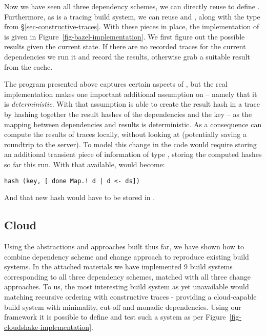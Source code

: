 Now we have seen all three dependency schemes, we can directly reuse  to define \Bazel. Furthermore, as \Bazel is a tracing build system, we can reuse  and , along with the  type from \S\ref{sec-constructive-traces}. With these pieces in place, the implementation of \Bazel is given in Figure~\ref{fig-bazel-implementation}. We first figure out the possible results given the current state. If there are no recorded traces for the current dependencies we run it and record the results, otherwise grab a suitable result from the  cache.

The program presented above captures certain aspects of \Bazel, but the real implementation makes one important additional assumption on  -- namely that it is \textit{deterministic}. With that assumption \Bazel is able to create the result hash in a trace by hashing together the result hashes of the dependencies and the key -- as the mapping between dependencies and results is deterministic. As a consequence \Bazel can compute the results of traces locally, without looking at  (potentially saving a roundtrip to the server). To model this change in the code would require storing an additional transient piece of information  of type , storing the computed hashes so far this run. With that available,  would become:

\begin{verbatim}
hash (key, [ done Map.! d | d <- ds])
\end{verbatim}

And that new hash would have to be stored in .

\subsection{Cloud \Shake}\label{sec-implementation-cloud-shake}

Using the abstractions and approaches built thus far, we have shown how to combine dependency scheme and change approach to reproduce existing build systems. In the attached materials we have implemented 9 build systems corresponding to all three dependency schemes, matched with all three change approaches. To us, the most interesting build system as yet unavailable would matching recursive ordering with constructive traces - providing a cloud-capable build system with minimality, cut-off and monadic dependencies. Using our framework it is possible to define and test such a system as per Figure~\ref{fig-cloudshake-implementation}.

